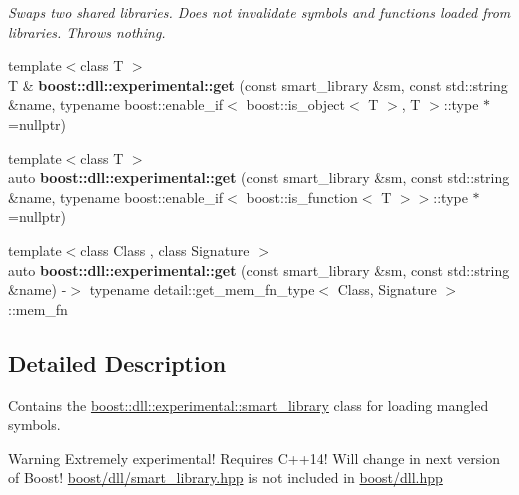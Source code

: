 \begin{DoxyCompactItemize}
\begin{DoxyCompactList}\small\item\em Swaps two shared libraries. Does not invalidate symbols and functions loaded from libraries. Throws nothing. \end{DoxyCompactList}\item 
{\footnotesize template$<$class T $>$ }\\T \& {\bfseries boost\+::dll\+::experimental\+::get} (const smart\+\_\+library \&sm, const std\+::string \&name, typename boost\+::enable\+\_\+if$<$ boost\+::is\+\_\+object$<$ T $>$, T $>$\+::type $\ast$=nullptr)\hypertarget{a00738_ab1927abcb5b6d0ac4bf1559fcfd0e203}{}\label{a00738_ab1927abcb5b6d0ac4bf1559fcfd0e203}

\item 
{\footnotesize template$<$class T $>$ }\\auto {\bfseries boost\+::dll\+::experimental\+::get} (const smart\+\_\+library \&sm, const std\+::string \&name, typename boost\+::enable\+\_\+if$<$ boost\+::is\+\_\+function$<$ T $>$$>$\+::type $\ast$=nullptr)\hypertarget{a00738_a3d4eee77486ffa45b0efca38762d80d5}{}\label{a00738_a3d4eee77486ffa45b0efca38762d80d5}

\item 
{\footnotesize template$<$class Class , class Signature $>$ }\\auto {\bfseries boost\+::dll\+::experimental\+::get} (const smart\+\_\+library \&sm, const std\+::string \&name) -\/$>$ typename detail\+::get\+\_\+mem\+\_\+fn\+\_\+type$<$ Class, Signature $>$\+::mem\+\_\+fn\hypertarget{a00738_a373e3fa06ec3984c55e7eb38f78fc35c}{}\label{a00738_a373e3fa06ec3984c55e7eb38f78fc35c}

\end{DoxyCompactItemize}


\subsection{Detailed Description}
Contains the \hyperlink{a00281}{boost\+::dll\+::experimental\+::smart\+\_\+library} class for loading mangled symbols. 

\begin{DoxyWarning}{Warning}
Extremely experimental! Requires C++14! Will change in next version of Boost! \hyperlink{a00738}{boost/dll/smart\+\_\+library.\+hpp} is not included in \hyperlink{a00472}{boost/dll.\+hpp} 
\end{DoxyWarning}
